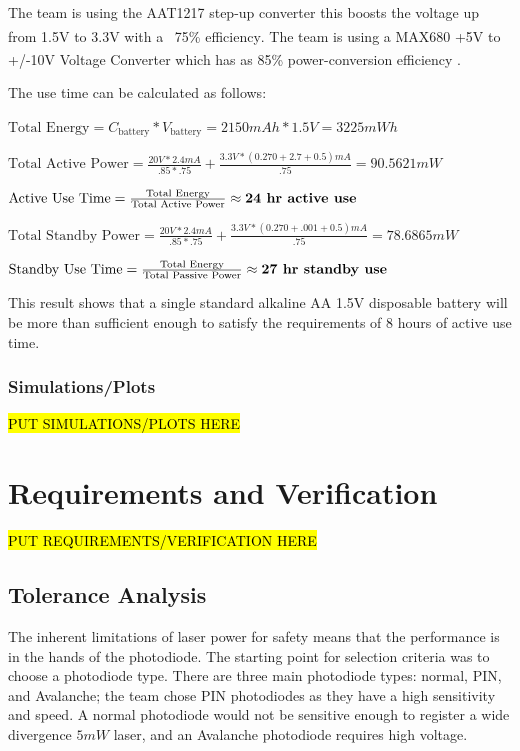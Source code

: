 \documentclass[letterpaper,10pt]{article}
\begin{document}
\begin{spacing}{1.15}
The team is using the AAT1217 step-up converter this boosts the voltage up from 1.5V to 3.3V with a ~75\% efficiency\textsuperscript{\cite{AAT1217}}. The team is using a MAX680 +5V to +/-10V Voltage Converter which has as 85\% power-conversion efficiency \textsuperscript{\cite{MAX680}} . 

The use time can be calculated as follows:

\begin{center} 
	$\textrm{Total Energy} = C_\textrm{battery} * V_\textrm{battery} = 2150 mAh * 1.5V = 3225 mWh$
	
	$\textrm{Total Active Power} = \frac{20V * 2.4 mA}{.85 * .75} + \frac{3.3 V * (0.270 + 2.7 + 0.5) mA}{.75} = 90.5621 mW$
	
	$\textrm{Active Use Time} = \frac{\textrm{Total Energy}}{\textrm{Total Active Power}} \approx \textrm{\textbf{24 hr active use}}$
	
	$\textrm{Total Standby Power} = \frac{20V * 2.4 mA}{.85 * .75} + \frac{3.3 V * (0.270 + .001 + 0.5) mA}{.75} = 78.6865 mW$
	
	$\textrm{Standby Use Time} = \frac{\textrm{Total Energy}}{\textrm{Total Passive Power}} \approx \textrm{\textbf{27 hr standby use}}$
\end{center}

This result shows that a single standard alkaline AA 1.5V disposable battery will be more than sufficient enough to satisfy the requirements of 8 hours of active use time.


\subsubsection{Simulations/Plots}
\hl{PUT SIMULATIONS/PLOTS HERE}


\section{Requirements and Verification} \label{section-requirements-verification}
\hl{PUT REQUIREMENTS/VERIFICATION HERE}

\subsection{Tolerance Analysis} \label{section-tolerance-analysis}
The inherent limitations of laser power for safety means that the performance is in the hands of the photodiode. The starting point for selection criteria was to choose a photodiode type. There are three main photodiode types: normal, PIN, and Avalanche; the team chose PIN photodiodes as they have a high sensitivity and speed. A normal photodiode would not be sensitive enough to register a wide divergence $5mW$ laser, and an Avalanche photodiode requires high voltage. 


\end{spacing}
\end{document}
